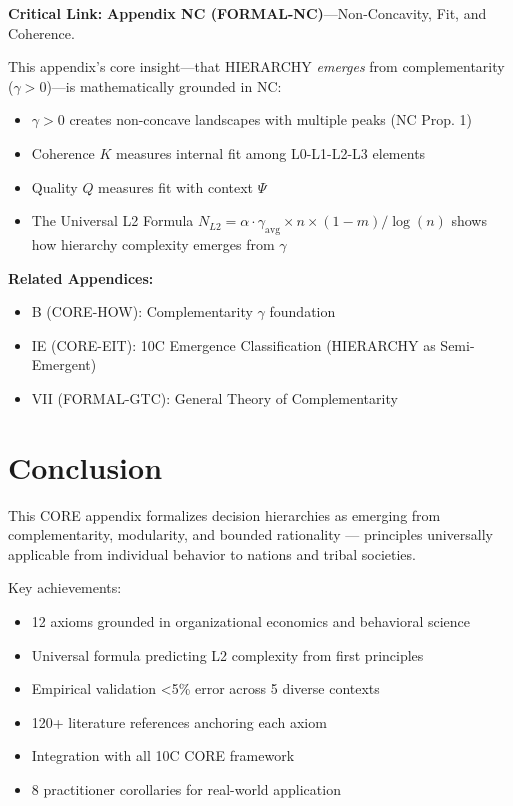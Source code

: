 \begin{tcolorbox}[colback=gray!5!white, colframe=gray!50!black]
\textbf{Critical Link:} \textbf{Appendix NC (FORMAL-NC)}---Non-Concavity, Fit, and Coherence.

This appendix's core insight---that HIERARCHY \textit{emerges} from complementarity ($\gamma > 0$)---is mathematically grounded in NC:
\begin{itemize}[nosep]
\item $\gamma > 0$ creates non-concave landscapes with multiple peaks (NC Prop. 1)
\item Coherence $K$ measures internal fit among L0-L1-L2-L3 elements
\item Quality $Q$ measures fit with context $\Psi$
\item The Universal L2 Formula $N_{L2} = \alpha \cdot \gamma_{\text{avg}} \times n \times (1-m) / \log(n)$ shows how hierarchy complexity emerges from $\gamma$
\end{itemize}

\textbf{Related Appendices:}
\begin{itemize}[nosep]
\item B (CORE-HOW): Complementarity $\gamma$ foundation
\item IE (CORE-EIT): 10C Emergence Classification (HIERARCHY as Semi-Emergent)
\item VII (FORMAL-GTC): General Theory of Complementarity
\end{itemize}
\end{tcolorbox}


\section{Conclusion}

This CORE appendix formalizes decision hierarchies as emerging from complementarity, modularity, and bounded rationality — principles universally applicable from individual behavior to nations and tribal societies.

Key achievements:
\begin{itemize}[nosep]
    \item 12 axioms grounded in organizational economics and behavioral science
    \item Universal formula predicting L2 complexity from first principles
    \item Empirical validation <5\% error across 5 diverse contexts
    \item 120+ literature references anchoring each axiom
    \item Integration with all 10C CORE framework
    \item 8 practitioner corollaries for real-world application
\end{itemize}

